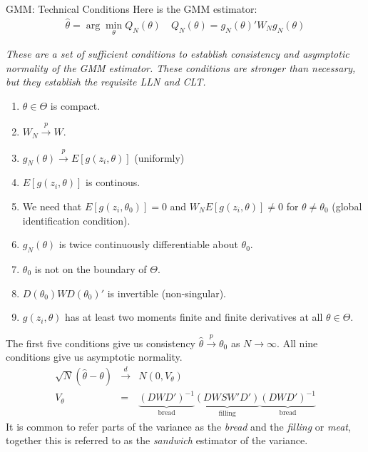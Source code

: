 \documentclass[aspectratio=169]{beamer}
\begin{document}
\begin{frame}{GMM: Technical Conditions}
\footnotesize
Here is the GMM estimator:
\begin{eqnarray*}
\hat{\theta} = \arg \min_{\theta}  Q_N(\theta) \quad Q_N(\theta)=g_N(\theta)' W_N  g_N(\theta)
\end{eqnarray*}

\textit{These are a set of sufficient conditions to establish consistency and asymptotic normality of the GMM estimator. These conditions are stronger than necessary, but they establish the requisite LLN and CLT.}

\begin{enumerate}
\item $\theta \in \Theta$ is compact.
\item $W_N \overset{p}{\to} W$.
\item $g_N(\theta) \overset{p}{\to} E[g(z_i,\theta)]$ (uniformly)
\item $E[g(z_i,\theta)]$ is continous.
\item We need that $E[g(z_i,\theta_0)]=0$ and $W_N E[g(z_i,\theta)] \neq 0$ for $\theta \neq \theta_0$ (global identification condition).
\item $g_N(\theta)$ is twice continuously differentiable about $\theta_0$.
\item $\theta_0$ is not on the boundary of $\Theta$.
\item $D(\theta_0) W D(\theta_0)'$ is invertible (non-singular).
\item $g(z_i,\theta)$ has at least two moments finite and finite derivatives at all $\theta \in \Theta$.
\end{enumerate}
The first five conditions give us consistency $\hat{\theta} \overset{p}{\to} \theta_0$ as $N \rightarrow \infty$. All nine conditions give us asymptotic normality.
\begin{eqnarray*}
\sqrt{N}(\hat{\theta}-\theta)  &\overset{d}{\to}& N(0,V_{\theta})\\
V_{\theta} &=& \underbrace{(D W D')^{-1}}_{\mbox{bread}} \underbrace{(D W S W' D')}_{\mbox{filling}}\underbrace{(D W D')^{-1}}_{\mbox{bread}} 
\end{eqnarray*}
It is common to refer parts of the variance as the \textit{bread} and the \textit{filling} or \textit{meat}, together this is referred to as the \textit{sandwich} estimator of the variance.
\end{frame}
\end{document}
